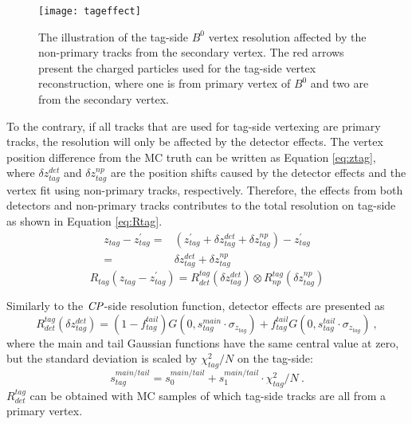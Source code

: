 \begin{figure}[htpb]
\centering
\texttt{[image: tageffect]}
\caption{The illustration of the tag-side $B^0$ vertex resolution affected by the non-primary tracks from the secondary vertex. The red arrows present the charged particles used for the tag-side vertex reconstruction, where one is from primary vertex of $B^0$ and two are from the secondary vertex.}
\label{fig:tagvet}
\end{figure}
To the contrary, if all tracks that are used for tag-side vertexing are primary tracks, the resolution will only be affected by the detector effects. The vertex position difference from the MC truth can be written as Equation \ref{eq:ztag}, where $\delta z_{tag}^{det}$ and $\delta z_{tag}^{np}$ are the position shifts caused by the detector effects and the vertex fit using non-primary tracks, respectively. Therefore, the effects from both detectors and non-primary tracks contributes to the total resolution on tag-side as shown in Equation \ref{eq:Rtag}.
\begin{equation}\label{eq:ztag}
\begin{split}
z_{tag} - z_{tag}^{'} =& (z_{tag}^{'} + \delta z_{tag}^{det} + \delta z_{tag}^{np}) - z_{tag}^{'}\\
=&\delta z_{tag}^{det} + \delta z_{tag}^{np}
\end{split}
\end{equation}
\begin{equation}\label{eq:Rtag}
R_{tag}( z_{tag}- z_{tag}^{'}) = R_{det}^{tag}(\delta z_{tag}^{det}) \otimes
R_{np}^{tag}( \delta z_{tag}^{np})
\end{equation}

Similarly to the $\it{CP}$-side resolution function, detector effects are presented as
\begin{equation}\label{eq:Rtagdet}
R_{det}^{tag}(\delta z_{tag}^{det}) = (1-f_{tag}^{tail})G(0,s_{tag}^{main}\cdot\sigma_{z_{tag}})+
f_{tag}^{tail}G(0,s_{tag}^{tail}\cdot\sigma_{z_{tag}})~,
\end{equation} where the main and tail Gaussian functions have the same central value at zero, but the standard deviation is scaled by $\chi^2_{tag}/N$ on the tag-side:
\begin{equation}\label{eq:stag}
s_{tag}^{main/tail} = s_0^{main/tail} + s_1^{main/tail}\cdot\chi^2_{tag}/N~.
\end{equation} 
$R^{tag}_{det}$ can be obtained with MC samples of which tag-side tracks are all from a primary vertex. 

